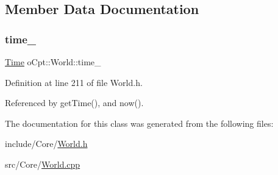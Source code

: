 \subsection{Member Data Documentation}
\hypertarget{classo_cpt_1_1_world_a2f93632f34dd13d0a61eec6d8d2879ff}{}\label{classo_cpt_1_1_world_a2f93632f34dd13d0a61eec6d8d2879ff} 
\subsubsection{\texorpdfstring{time\+\_\+}{time\_}}
{\footnotesize\ttfamily \hyperlink{classo_cpt_1_1_world_1_1_time}{Time} o\+Cpt\+::\+World\+::time\+\_\+\hspace{0.3cm}{\ttfamily [protected]}}



Definition at line 211 of file World.\+h.



Referenced by get\+Time(), and now().



The documentation for this class was generated from the following files\+:\begin{DoxyCompactItemize}
\item 
include/\+Core/\hyperlink{_world_8h}{World.\+h}\item 
src/\+Core/\hyperlink{_world_8cpp}{World.\+cpp}\end{DoxyCompactItemize}
